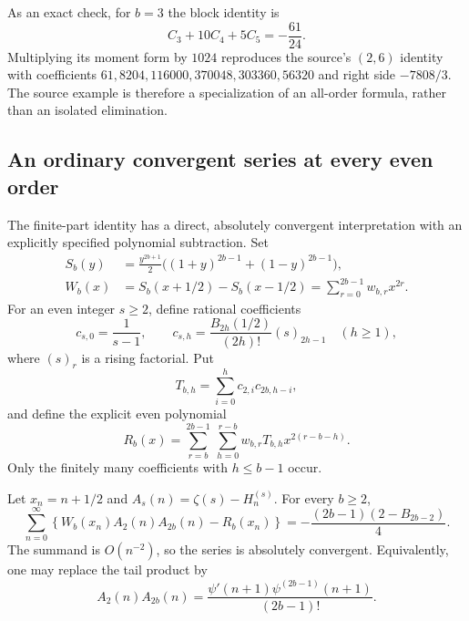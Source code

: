 As an exact check, for $b=3$ the block identity is
\[
 C_3+10C_4+5C_5=-\frac{61}{24}.
\]
Multiplying its moment form by $1024$ reproduces the source's
$(2,6)$ identity with coefficients
$61,8204,116000,370048,303360,56320$ and right side $-7808/3$.
The source example is therefore a specialization of an all-order
formula, rather than an isolated elimination.

\subsection{An ordinary convergent series at every even order}

The finite-part identity has a direct, absolutely convergent
interpretation with an explicitly specified polynomial subtraction.
Set
\begin{align}
 S_b(y)&=\frac{y^{2b+1}}2
       \bigl((1+y)^{2b-1}+(1-y)^{2b-1}\bigr),
       \label{eq:S-polynomial-two}\\
 W_b(x)&=S_b(x+1/2)-S_b(x-1/2)
        =\sum_{r=0}^{2b-1}w_{b,r}x^{2r}.
       \label{eq:W-polynomial-two}
\end{align}
For an even integer $s\geq2$, define rational coefficients
\[
 c_{s,0}=\frac1{s-1},\qquad
 c_{s,h}=\frac{B_{2h}(1/2)}{(2h)!}(s)_{2h-1}\quad(h\geq1),
\]
where $(s)_r$ is a rising factorial.  Put
\[
 T_{b,h}=\sum_{i=0}^hc_{2,i}c_{2b,h-i},
\]
and define the explicit even polynomial
\begin{equation}\label{eq:subtraction-two}
 R_b(x)=\sum_{r=b}^{2b-1}\ \sum_{h=0}^{r-b}
       w_{b,r}T_{b,h}x^{2(r-b-h)}.
\end{equation}
Only the finitely many coefficients with $h\leq b-1$ occur.

\begin{corollary}
\label{cor:ordinary-two}
Let $x_n=n+1/2$ and $A_s(n)=\zeta(s)-H_n^{(s)}$.  For every
$b\geq2$,
\begin{equation}\label{eq:ordinary-two}
 \sum_{n=0}^{\infty}
 \left\{W_b(x_n)A_2(n)A_{2b}(n)-R_b(x_n)\right\}
 =-\frac{(2b-1)(2-B_{2b-2})}{4}.
\end{equation}
The summand is $O(n^{-2})$, so the series is absolutely convergent.
Equivalently, one may replace the tail product by
\[
 A_2(n)A_{2b}(n)
 =\frac{\psi'(n+1)\psi^{(2b-1)}(n+1)}{(2b-1)!}.
\]
\end{corollary}


